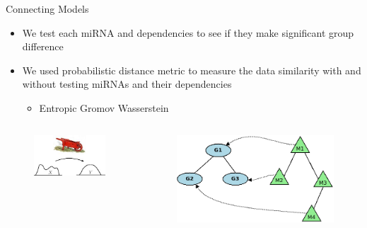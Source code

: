 \documentclass{beamer}
\begin{document}
\begin{frame}{Connecting Models}
	\begin{itemize}
		\item We test each miRNA and dependencies to see if they make significant group difference
		\item We used probabilistic distance metric to measure the data similarity with and without testing miRNAs and their dependencies
		      \begin{itemize}
			      \item Entropic Gromov Wasserstein
		      \end{itemize}
	\end{itemize}
	\begin{columns}
		\begin{column}{.48\textwidth}
			\begin{figure}[ht]
				\centering
				\includegraphics[width=0.7\textheight]{img/earth-mover-distance.jpeg}
				\caption*{\label{fig:emd}}
			\end{figure}
		\end{column}
		\begin{column}{.48\textwidth}
			\begin{figure}[ht]
				\centering
				\includegraphics[width=0.7\textheight]{img/connect-networks.png}
				\caption*{\label{fig:connect-networks}}
			\end{figure}
		\end{column}
	\end{columns}
\end{frame}
\end{document}
